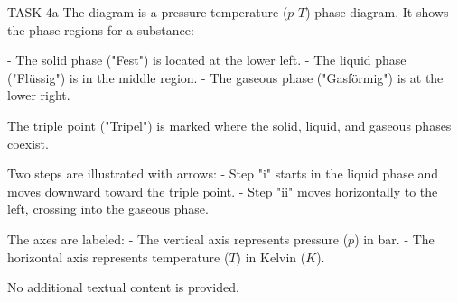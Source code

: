 TASK 4a  
The diagram is a pressure-temperature (\( p \)-\( T \)) phase diagram. It shows the phase regions for a substance:  

- The solid phase ("Fest") is located at the lower left.  
- The liquid phase ("Flüssig") is in the middle region.  
- The gaseous phase ("Gasförmig") is at the lower right.  

The triple point ("Tripel") is marked where the solid, liquid, and gaseous phases coexist.  

Two steps are illustrated with arrows:  
- Step "i" starts in the liquid phase and moves downward toward the triple point.  
- Step "ii" moves horizontally to the left, crossing into the gaseous phase.  

The axes are labeled:  
- The vertical axis represents pressure (\( p \)) in bar.  
- The horizontal axis represents temperature (\( T \)) in Kelvin (\( K \)).  

No additional textual content is provided.